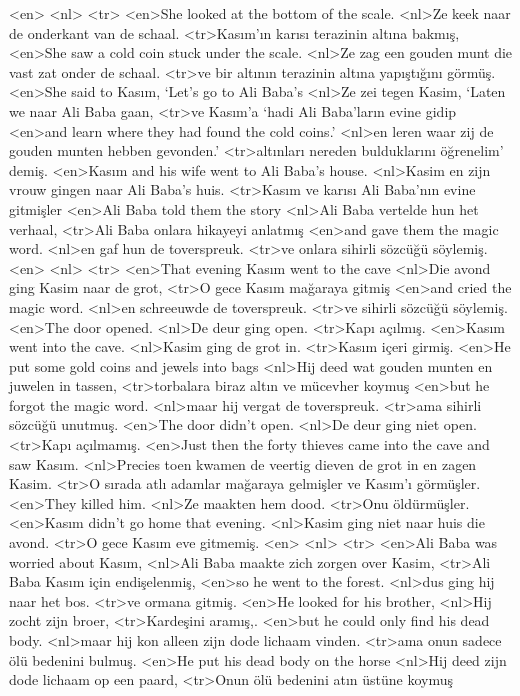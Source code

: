 <en>
<nl>
<tr>
<en>She looked at the bottom of the scale.
<nl>Ze keek naar de onderkant van de schaal. 
<tr>Kasım’ın karısı terazinin altına bakmış,
<en>She saw a cold coin stuck under the scale.
<nl>Ze zag een gouden munt die vast zat onder de schaal. 
<tr>ve bir altının terazinin altına yapıştığını görmüş.
<en>She said to Kasım, `Let’s go to Ali Baba’s
<nl>Ze zei tegen Kasim, `Laten we naar Ali Baba gaan,
<tr>ve Kasım’a `hadi Ali Baba’ların evine gidip
<en>and learn where they had found the cold coins.'
<nl>en leren waar zij de gouden munten hebben gevonden.' 
<tr>altınları nereden bulduklarını öğrenelim' demiş.
<en>Kasım and his wife went to Ali Baba’s house.
<nl>Kasim en zijn vrouw gingen naar Ali Baba's huis. 
<tr>Kasım ve karısı Ali Baba’nın evine gitmişler
<en>Ali Baba  told them the story
<nl>Ali Baba vertelde hun het verhaal, 
<tr>Ali Baba onlara hikayeyi anlatmış
<en>and gave them the magic word.
<nl>en gaf hun de toverspreuk. 
<tr>ve onlara sihirli sözcüğü söylemiş.
<en>
<nl>
<tr>
<en>That evening Kasım went to the cave
<nl>Die avond ging Kasim naar de grot, 
<tr>O gece Kasım mağaraya gitmiş
<en>and cried the magic word.
<nl>en schreeuwde de toverspreuk. 
<tr>ve sihirli sözcüğü söylemiş.
<en>The door opened.
<nl>De deur ging open. 
<tr>Kapı açılmış.
<en>Kasım went into the cave.
<nl>Kasim ging de grot in.
<tr>Kasım içeri girmiş.
<en>He put some gold coins and jewels into bags
<nl>Hij deed wat gouden munten en juwelen in tassen, 
<tr>torbalara biraz altın ve mücevher koymuş
<en>but he forgot the magic word.
<nl>maar hij vergat de toverspreuk. 
<tr>ama sihirli sözcüğü unutmuş.
<en>The door didn’t open.
<nl>De deur ging niet open. 
<tr>Kapı açılmamış.
<en>Just then the forty thieves came into the cave and saw Kasım.
<nl>Precies toen kwamen de veertig dieven de grot in en zagen Kasim. 
<tr>O sırada atlı adamlar mağaraya gelmişler ve Kasım’ı görmüşler.
<en>They killed him.
<nl>Ze maakten hem dood. 
<tr>Onu öldürmüşler.
<en>Kasım didn’t go home that evening.
<nl>Kasim ging niet naar huis die avond. 
<tr>O gece Kasım eve gitmemiş.
<en>
<nl>
<tr>
<en>Ali Baba was worried about Kasım,
<nl>Ali Baba maakte zich zorgen over Kasim, 
<tr>Ali Baba Kasım için endişelenmiş,
<en>so he went to the forest.
<nl>dus ging hij naar het bos. 
<tr>ve ormana gitmiş.
<en>He looked for his brother,
<nl>Hij zocht zijn broer, 
<tr>Kardeşini aramış,.
<en>but he could only find his dead body.
<nl>maar hij kon alleen zijn dode lichaam vinden. 
<tr>ama onun sadece ölü bedenini bulmuş.
<en>He put his dead body on the horse
<nl>Hij deed zijn dode lichaam op een paard, 
<tr>Onun ölü bedenini atın üstüne koymuş 
